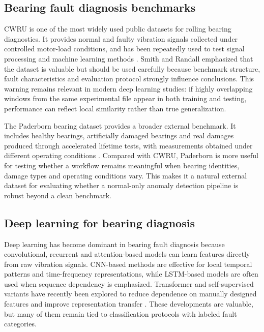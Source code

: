 \documentclass[pdflatex,sn-mathphys-num]{sn-jnl}
\begin{document}
\subsection{Bearing fault diagnosis benchmarks}

CWRU is one of the most widely used public datasets for rolling bearing diagnostics. It provides normal and faulty vibration signals collected under controlled motor-load conditions, and has been repeatedly used to test signal processing and machine learning methods \citep{cwru_dataset,smith2015cwru}. Smith and Randall \citep{smith2015cwru} emphasized that the dataset is valuable but should be used carefully because benchmark structure, fault characteristics and evaluation protocol strongly influence conclusions. This warning remains relevant in modern deep learning studies: if highly overlapping windows from the same experimental file appear in both training and testing, performance can reflect local similarity rather than true generalization.

The Paderborn bearing dataset provides a broader external benchmark. It includes healthy bearings, artificially damaged bearings and real damages produced through accelerated lifetime tests, with measurements obtained under different operating conditions \citep{lessmeier2016paderborn,paderborn_datacenter}. Compared with CWRU, Paderborn is more useful for testing whether a workflow remains meaningful when bearing identities, damage types and operating conditions vary. This makes it a natural external dataset for evaluating whether a normal-only anomaly detection pipeline is robust beyond a clean benchmark.

\subsection{Deep learning for bearing diagnosis}

Deep learning has become dominant in bearing fault diagnosis because convolutional, recurrent and attention-based models can learn features directly from raw vibration signals. CNN-based methods are effective for local temporal patterns and time-frequency representations, while LSTM-based models are often used when sequence dependency is emphasized. Transformer and self-supervised variants have recently been explored to reduce dependence on manually designed features and improve representation transfer \citep{li2024cnnreview,masked2025swin,phm2024selfsupervised}. These developments are valuable, but many of them remain tied to classification protocols with labeled fault categories.
\end{document}
